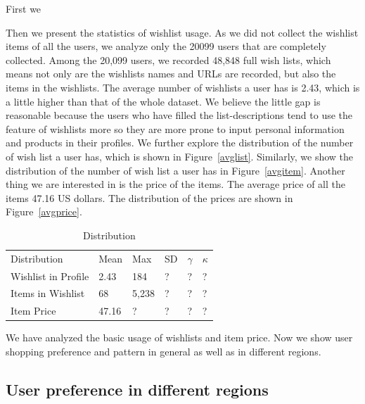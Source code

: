 First we 

Then we present the statistics of wishlist usage. As we did not collect the wishlist items of all the users, we analyze only the 20099 users that are completely collected. Among the 20,099 users, we recorded 48,848 full wish lists, which means not only are the wishlists names and URLs are recorded, but also the items in the wishlists. The average number of wishlists a user has is 2.43, which is a little higher than that of the whole dataset. We believe the little gap is reasonable because the users who have filled the list-descriptions tend to use the feature of wishlists more so they are more prone to input personal information and products in their profiles. We further explore the distribution of the number of wish list a user has, which is shown in Figure~\ref{avglist}. Similarly, we show the distribution of the number of wish list a user has in Figure~\ref{avgitem}. Another thing we are interested in is the price of the items. The average price of all the items 47.16 US dollars. The distribution of the prices are shown in Figure~\ref{avgprice}. 

\begin{table}[!htbp]
\centering
\caption{Distribution}
\label{tb:stat2}
\begin{adjustbox}{max width=.5\textwidth}
\begin{tabular}{llllll}
Distribution & Mean & Max & SD & $\gamma$ & $\kappa$ \\
Wishlist in Profile & 2.43 & 184 &? &? &? \\
Items in Wishlist & 68 & 5,238 & ? & ? & ?\\
Item Price & 47.16 & ? & ? & ? & ? \\
\end{tabular}
\end{adjustbox}
\end{table}

We have analyzed the basic usage of wishlists and item price. Now we show user shopping preference and pattern in general as well as in different regions. 

\subsection{User preference in different regions}

